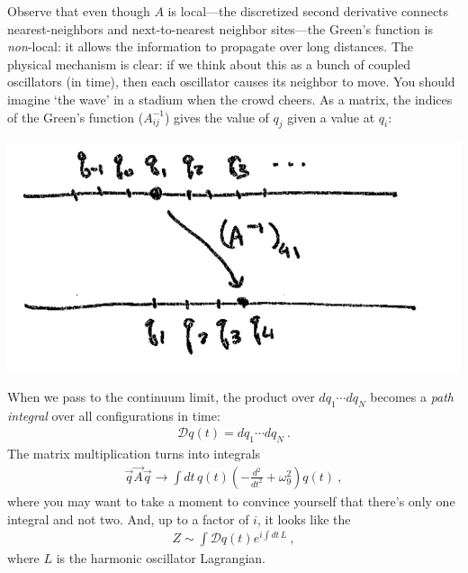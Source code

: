 Observe that even though $A$ is local---the discretized second derivative connects nearest-neighbors and next-to-nearest neighbor sites---the Green's function is \emph{non}-local: it allows the information to propagate over long distances. The physical mechanism is clear: if we think about this as a bunch of coupled oscillators (in time), then each oscillator causes its neighbor to move. You should imagine `the wave' in a stadium when the crowd cheers. As a matrix, the indices of the Green's function ($A^{-1}_{ij}$) gives the value of $q_j$ given a value at $q_i$:
\begin{center}
\includegraphics[width=.4\textwidth]{figures/P230b_2Ainv.png}
\end{center}
When we pass to the continuum limit, the product over $dq_1\cdots dq_N$ becomes a \emph{path integral} over all configurations in time:
\begin{align}
	\mathcal Dq(t) = dq_1\cdots dq_N \ .
\end{align}
The matrix multiplication turns into integrals
\begin{align}
	\vec{q}\vec{A}\vec{q} \to \int dt\, q(t) \left(-\frac{d^2}{dt^2} + \omega_9^2\right) q(t) \ ,
\end{align}
where you may want to take a moment to convince yourself that there's only one integral and not two. And, up to a factor of $i$, it looks like the 
\begin{align}
	Z \sim \int \mathcal Dq(t) e^{i\int dt\, L} \ ,
\end{align}
where $L$ is the harmonic oscillator Lagrangian.



